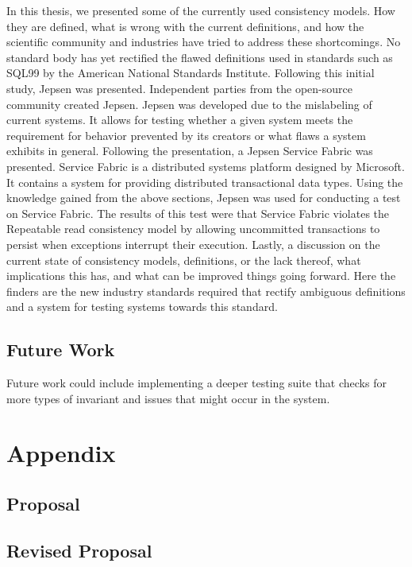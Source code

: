 \documentclass[a4paper,10pt,titlepage]{report}
\begin{document}
In this thesis, we presented some of the currently used consistency models. How they are defined, what is wrong with the current definitions, and how the scientific community and industries have tried to address these shortcomings. No standard body has yet rectified the flawed definitions used in standards such as SQL99\cite{ansisql1999} by the American National Standards Institute. 
Following this initial study, Jepsen was presented. Independent parties from the open-source community created Jepsen. Jepsen was developed due to the mislabeling of current systems. It allows for testing whether a given system meets the requirement for behavior prevented by its creators or what flaws a system exhibits in general. 
Following the presentation, a Jepsen Service Fabric was presented. Service Fabric is a  distributed systems platform designed by Microsoft. It contains a system for providing distributed transactional data types. 
Using the knowledge gained from the above sections, Jepsen was used for conducting a test on Service Fabric. The results of this test were that Service Fabric violates the Repeatable read consistency model by allowing uncommitted transactions to persist when exceptions interrupt their execution. 
Lastly, a discussion on the current state of consistency models, definitions, or the lack thereof, what implications this has, and what can be improved things going forward. Here the finders are the new industry standards required that rectify ambiguous definitions and a system for testing systems towards this standard.



\section{Future Work}

Future work could include implementing a deeper testing suite that checks for more types of invariant and issues that might occur in the system.


\newpage
\chapter{Appendix}

\pagestyle{empty}
\printbibliography


\section{Proposal}


\section{Revised Proposal}

\todototoc
\listoftodos
\end{document}
